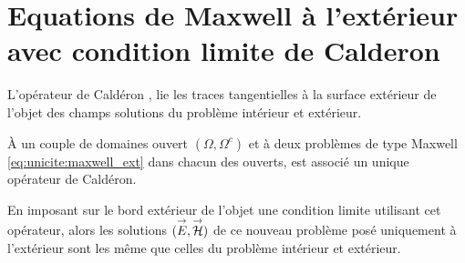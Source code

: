 \section{Equations de Maxwell à l'extérieur avec condition limite de Calderon}
    L'opérateur de Caldéron \cite[Def~4, p.~108]{cessenat_mathematical_1996}, lie les traces tangentielles à la surface extérieur de l'objet des champs solutions du problème intérieur et extérieur.
    
    À un couple de domaines ouvert \((\Omega, \Omega^c)\) et à deux problèmes de type Maxwell \eqref{eq:unicite:maxwell_ext} dans chacun des ouverts, est associé un unique opérateur de Caldéron.

    En imposant sur le bord extérieur de l'objet une condition limite utilisant cet opérateur, alors les solutions \(({\overset{\rightarrow}{E}},{\overset{\rightarrow}{\mathcal{H}}})\) de ce nouveau problème posé uniquement à l'extérieur sont les même que celles du problème intérieur et extérieur.

